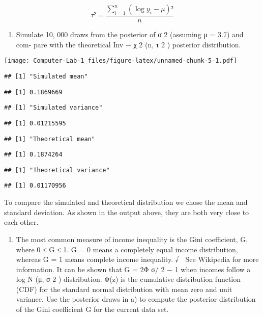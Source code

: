 \documentclass[]{article}
\providecommand{\tightlist}{%
  \setlength{\itemsep}{0pt}\setlength{\parskip}{0pt}}
\begin{document}
\[\tau² = \frac{\sum_{i=1}^{n}(\log y_i-\mu)²}{n}\]

\begin{enumerate}
\def\labelenumi{(\alph{enumi})}
\tightlist
\item
  Simulate 10, 000 draws from the posterior of σ 2 (assuming μ = 3.7)
  and com- pare with the theoretical Inv − χ 2 (n, τ 2 ) posterior
  distribution.
\end{enumerate}

\texttt{[image: Computer-Lab-1\_files/figure-latex/unnamed-chunk-5-1.pdf]}

\begin{verbatim}
## [1] "Simulated mean"
\end{verbatim}

\begin{verbatim}
## [1] 0.1869669
\end{verbatim}

\begin{verbatim}
## [1] "Simulated variance"
\end{verbatim}

\begin{verbatim}
## [1] 0.01215595
\end{verbatim}

\begin{verbatim}
## [1] "Theoretical mean"
\end{verbatim}

\begin{verbatim}
## [1] 0.1874264
\end{verbatim}

\begin{verbatim}
## [1] "Theoretical variance"
\end{verbatim}

\begin{verbatim}
## [1] 0.01170956
\end{verbatim}

To compare the simulated and theoretical distribution we chose the mean
and standard deviation. As shown in the output above, they are both very
close to each other.

\begin{enumerate}
\def\labelenumi{(\alph{enumi})}
\setcounter{enumi}{1}
\tightlist
\item
  The most common measure of income inequality is the Gini coefficient,
  G, where 0 ≤ G ≤ 1. G = 0 means a completely equal income
  distribution, whereas G = 1 means complete income inequality. √  See
  Wikipedia for more information. It can be shown that G = 2Φ σ/ 2 − 1
  when incomes follow a log N (μ, σ 2 ) distribution. Φ(z) is the
  cumulative distribution function (CDF) for the standard normal
  distribution with mean zero and unit variance. Use the posterior draws
  in a) to compute the posterior distribution of the Gini coefficient G
  for the current data set.
\end{enumerate}
\end{document}
